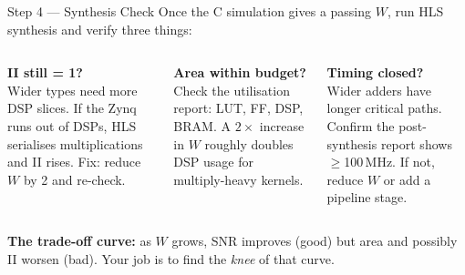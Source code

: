 \documentclass[aspectratio=169,12pt]{beamer}
\begin{document}
\begin{frame}[t]{Step 4 --- Synthesis Check}
\vspace{0.05cm}
{\small Once the C simulation gives a passing $W$, run HLS synthesis and verify three things:}
\vspace{0.07cm}
\begin{columns}[T,totalwidth=\textwidth]
  \colorbox{Navy!10}{\parbox{\dimexpr\linewidth-2\fboxsep\relax}{%
    \vspace{2pt}
    {\color{Navy}\bfseries II still = 1?}\\[1pt]
    {\small Wider types need more DSP slices.
    If the Zynq runs out of DSPs, HLS serialises
    multiplications and II rises.
    Fix: reduce $W$ by 2 and re-check.}
    \vspace{2pt}
  }}
  \colorbox{Orange!10}{\parbox{\dimexpr\linewidth-2\fboxsep\relax}{%
    \vspace{2pt}
    {\color{Orange}\bfseries Area within budget?}\\[1pt]
    {\small Check the utilisation report: LUT, FF, DSP, BRAM.
    A $2\times$ increase in $W$ roughly doubles DSP usage
    for multiply-heavy kernels.}
    \vspace{2pt}
  }}
  \colorbox{Teal!10}{\parbox{\dimexpr\linewidth-2\fboxsep\relax}{%
    \vspace{2pt}
    {\color{Teal}\bfseries Timing closed?}\\[1pt]
    {\small Wider adders have longer critical paths.
    Confirm the post-synthesis report shows
    $\geq$100\,MHz.
    If not, reduce $W$ or add a pipeline stage.}
    \vspace{2pt}
  }}
\end{columns}
\vspace{0.1cm}
\colorbox{NavyDk!8}{\parbox{\textwidth}{%
  \vspace{1pt}
  {\small\color{NavyDk}
    \textbf{The trade-off curve:} as $W$ grows, SNR improves (good) but area and
    possibly II worsen (bad). Your job is to find the \emph{knee} of that curve.}
  \vspace{1pt}
}}
\end{frame}
\end{document}
